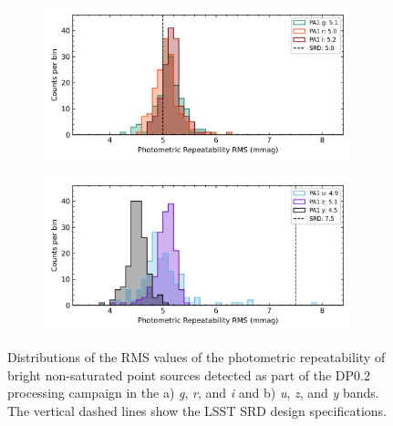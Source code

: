 \begin{figure}[h]
\begin{subfigure}{.5\textwidth}
    \centering
    \includegraphics[width=0.98\textwidth]{figures/dp02_pa1_alltracts_gri}
\end{subfigure}
\begin{subfigure}{.5\textwidth}
    \centering
    \includegraphics[width=0.98\textwidth]{figures/dp02_pa1_alltracts_uzy}
\end{subfigure}
\par\medskip
\caption{\label{fig:faro_dp02_distr_pa1}
Distributions of the RMS values of the photometric repeatability of bright non-saturated point sources detected as part of the DP0.2 processing campaign in the a) \emph{g}, \emph{r}, and \emph{i}  and  b) \emph{u}, \emph{z}, and \emph{y} bands.  
The vertical dashed lines show the LSST SRD design specifications. }
\end{figure}
